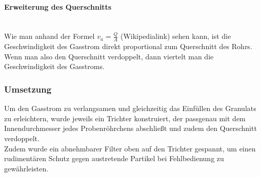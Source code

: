 \paragraph{Erweiterung des Querschnitts}

\hfill \\

Wie man anhand der Formel $v_a = \frac{Q}{A}$ (Wikipedialink) sehen kann, ist die Geschwindigkeit des Gasstrom direkt proportional zum Querschnitt des Rohrs. Wenn man also den Querschnitt verdoppelt, dann viertelt man die Geschwindigkeit des Gasstroms. 


\subsubsection{Umsetzung}

Um den Gasstrom zu verlangsamen und gleichzeitig das Einfüllen des Granulats zu erleichtern, wurde jeweils ein Trichter konstruiert, der passgenau mit dem Innendurchmesser jedes Probenröhrchens abschließt und zudem den Querschnitt verdoppelt. \\
Zudem wurde ein abnehmbarer Filter oben auf den Trichter gespannt, um einen rudimentären Schutz gegen austretende Partikel bei Fehlbedienung zu gewährleisten.





